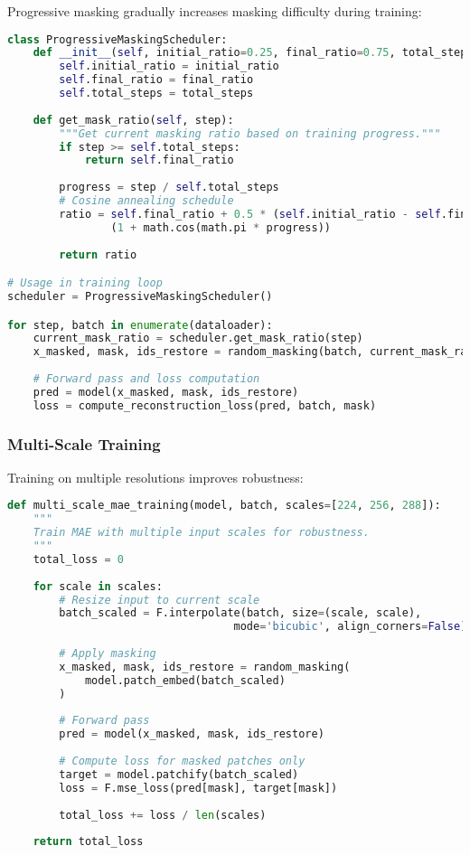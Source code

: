 Progressive masking gradually increases masking difficulty during training:

\begin{lstlisting}[language=Python, caption=Progressive masking curriculum for stable training]
class ProgressiveMaskingScheduler:
    def __init__(self, initial_ratio=0.25, final_ratio=0.75, total_steps=100000):
        self.initial_ratio = initial_ratio
        self.final_ratio = final_ratio
        self.total_steps = total_steps
    
    def get_mask_ratio(self, step):
        """Get current masking ratio based on training progress."""
        if step >= self.total_steps:
            return self.final_ratio
        
        progress = step / self.total_steps
        # Cosine annealing schedule
        ratio = self.final_ratio + 0.5 * (self.initial_ratio - self.final_ratio) * \
                (1 + math.cos(math.pi * progress))
        
        return ratio

# Usage in training loop
scheduler = ProgressiveMaskingScheduler()

for step, batch in enumerate(dataloader):
    current_mask_ratio = scheduler.get_mask_ratio(step)
    x_masked, mask, ids_restore = random_masking(batch, current_mask_ratio)
    
    # Forward pass and loss computation
    pred = model(x_masked, mask, ids_restore)
    loss = compute_reconstruction_loss(pred, batch, mask)
\end{lstlisting}

\subsubsection{Multi-Scale Training}

Training on multiple resolutions improves robustness:

\begin{lstlisting}[language=Python, caption=Multi-scale masked image modeling training]
def multi_scale_mae_training(model, batch, scales=[224, 256, 288]):
    """
    Train MAE with multiple input scales for robustness.
    """
    total_loss = 0
    
    for scale in scales:
        # Resize input to current scale
        batch_scaled = F.interpolate(batch, size=(scale, scale), 
                                   mode='bicubic', align_corners=False)
        
        # Apply masking
        x_masked, mask, ids_restore = random_masking(
            model.patch_embed(batch_scaled)
        )
        
        # Forward pass
        pred = model(x_masked, mask, ids_restore)
        
        # Compute loss for masked patches only
        target = model.patchify(batch_scaled)
        loss = F.mse_loss(pred[mask], target[mask])
        
        total_loss += loss / len(scales)
    
    return total_loss
\end{lstlisting}

